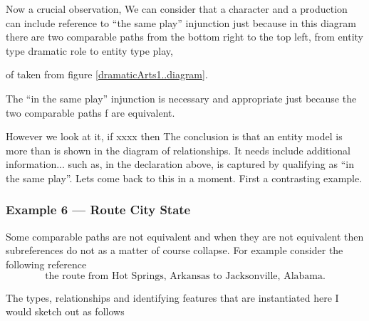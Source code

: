 \mynote
\begin{worktt}
Now a crucial observation, 
We can consider that a character and a production can include reference to ``the same play'' injunction  just because in this diagram 
there are two comparable paths from the bottom right to the top left, from entity type dramatic role to entity type play, 
\end{worktt}

\begin{equation}
\label{dramaticArtsPortrayalScopeFragment..diagram}

\end{equation}
of taken from figure \ref{dramaticArts1..diagram}.

The ``in the same play'' injunction is necessary 
and appropriate just because 
the two comparable paths f are equivalent.


\begin{reinstatett}
\mynote
However we look at it, if xxxx then The conclusion is that an entity model is more than is shown in the diagram of relationships. It needs include additional information... such as, in the declaration above,
 is captured by qualifying as ``in the same play''. Lets come back to this in a moment. First a contrasting example.
 \end{reinstatett} 

\subsubsection {Example 6 --- Route City State}

\mynote 
Some comparable paths are not equivalent and when they are not equivalent then subreferences do not as a matter of course collapse. For example consider the following reference
 \begin{equation*}
 \mbox{the route from Hot Springs, Arkansas to Jacksonville, Alabama.}
\end{equation*}

The types, relationships and identifying features that are instantiated here
I would sketch out as follows

\iffalse
\begin{equation*}

\end{equation*}
\fi
\begin{equation*}

\end{equation*}


